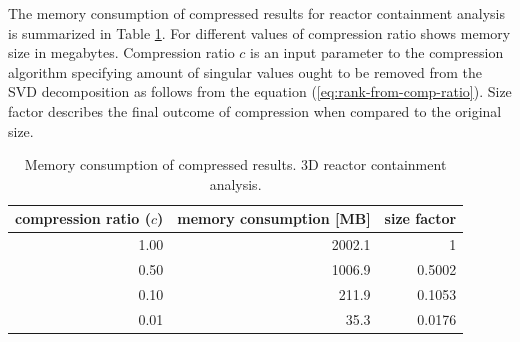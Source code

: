 The memory consumption of compressed results for reactor containment analysis is summarized in Table \ref{tab:mem-consum}. For different values of compression ratio shows memory size in megabytes. Compression ratio $c$ is an input parameter to the compression algorithm specifying amount of singular values ought to be removed from the SVD decomposition as follows from the equation (\ref{eq:rank-from-comp-ratio}). Size factor describes the final outcome of compression when compared to the original size.

\begin{table}[H]
\centering
\caption[Memory consumption of SVD compression]{Memory consumption of compressed results. 3D reactor containment analysis.}
    \begin{tabular}{|r | r | r|}
    \hline
    compression ratio ($c$) & memory consumption [MB] & size factor \\ \hline
    1.00 & 2002.1 & 1 \\
    0.50 & 1006.9 & 0.5002 \\
    0.10& 211.9 & 0.1053 \\
    0.01 & 35.3 & 0.0176 \\ \hline
    \end{tabular}
	\label{tab:mem-consum}
\end{table}
